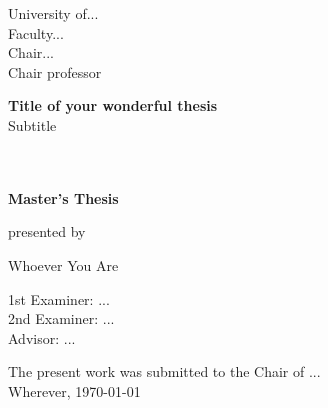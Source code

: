 \thispagestyle{headings}

\begin{titlepage}
	
  

\begin{flushleft}
  {
  \begin{center}
  	{\Large
      University of... \\
      Faculty...\\
      Chair... \\
      Chair professor \\
    }
    \vspace{6em}
  
    {\LARGE \textbf{Title of your wonderful thesis}\\}
    {\LARGE {Subtitle}\\}
    {\LARGE ~\\}
    {\LARGE ~\\}
    \vspace{3em}
		
    {\Large \textbf{Master's Thesis}\\}
  \end{center}

  \vfill
		{\large presented by\\} 
    
    {\LARGE {Whoever You Are\\}}
    \vspace{3em} 
		    
    {\Large {1st Examiner: ...}\\}
    \vspace{1em} 
    {\Large {2nd Examiner: ...}\\}
    \vspace{1em} 
    {\Large {Advisor: ...}\\}
    \vspace{7em} 

    {\large The present work was submitted to the Chair of ...\\}
    \vspace{1em}
		{\large	Wherever, \today\\}
  }
\end{flushleft}

\end{titlepage}

\restoregeometry
